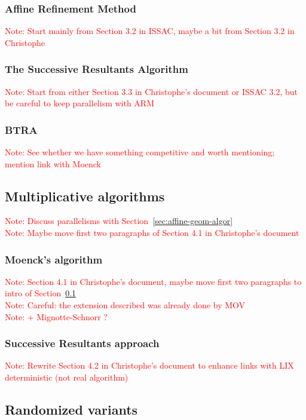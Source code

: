 \documentclass{article}
\newcounter{algo}
\newcommand{\Notes}[1]{\textcolor{red}{Note: #1}}
\begin{document}
\subsubsection{Affine Refinement Method}
\label{sec:ARN}
\Notes{Start mainly from Section 3.2 in ISSAC, maybe a bit from Section 3.2 in Christophe}


\subsubsection{The Successive Resultants Algorithm}
\label{sec:SRA}
\Notes{Start from either Section 3.3 in Christophe's document or ISSAC 3.2, but be careful to keep parallelism with ARM}


\subsubsection{BTRA}
\Notes{See whether we have something competitive and worth mentioning; mention link with Moenck}


\subsection{Multiplicative algorithms}
\label{sec:mult-algor}
\Notes{Discuss parallelisms with Section~\ref{sec:affine-geom-algor}}\\
\noindent\Notes{Maybe move first two paragraphs of Section 4.1 in Christophe's document}

\subsubsection{Moenck's algorithm}
\label{sec:Moenck}
\Notes{Section 4.1 in Christophe's document, maybe move first two paragraphs to intro of Section~\ref{sec:mult-algor}}\\
\noindent \Notes{Careful: the extension described was already done by MOV}\\
\noindent\Notes{+ Mignotte-Schnorr ?}

\subsubsection{Successive Resultants approach}
\label{sec:LIX}
\Notes{Rewrite Section 4.2 in Christophe's document to enhance links with LIX deterministic (not real algorithm)}



\subsection{Randomized variants}
\label{sec:randomized-variants}
\end{document}
